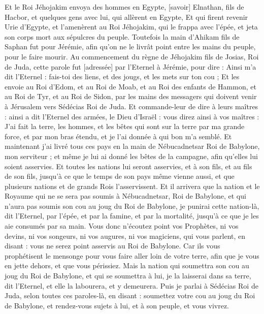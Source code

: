 \begin{multicols}{2}
Et le Roi Jéhojakim envoya des hommes en Egypte, [savoir] Elnathan, fils de Hacbor, et quelques gens avec lui, qui allèrent en Egypte,
Et qui firent revenir Urie d'Egypte, et l'amenèrent au Roi Jéhojakim, qui le frappa avec l'épée, et jeta son corps mort aux sépulcres du peuple.
Toutefois la main d'Ahikam fils de Saphan fut pour Jérémie, afin qu'on ne le livrât point entre les mains du peuple, pour le faire mourir.
\VerseOne{}Au commencement du règne de Jéhojakim fils de Josias, Roi de Juda, cette parole fut [adressée] par l'Eternel à Jérémie, pour dire :
Ainsi m'a dit l'Eternel : fais-toi des liens, et des jougs, et les mets sur ton cou ;
Et les envoie au Roi d'Edom, et au Roi de Moab, et au Roi des enfants de Hammon, et au Roi de Tyr, et au Roi de Sidon, par les mains des messagers qui doivent venir à Jérusalem vers Sédécias Roi de Juda.
Et commande-leur de dire à leurs maîtres : ainsi a dit l'Eternel des armées, le Dieu d'Israël : vous direz ainsi à vos maîtres :
J'ai fait la terre, les hommes, et les bêtes qui sont sur la terre par ma grande force, et par mon bras étendu, et je l'ai donnée à qui bon m'a semblé.
Et maintenant j'ai livré tous ces pays en la main de Nébucadnetsar Roi de Babylone, mon serviteur ; et même je lui ai donné les bêtes de la campagne, afin qu'elles lui soient asservies.
Et toutes les nations lui seront asservies, et à son fils, et au fils de son fils, jusqu’à ce que le temps de son pays même vienne aussi, et que plusieurs nations et de grands Rois l'asservissent.
Et il arrivera que la nation et le Royaume qui ne se sera pas soumis à Nébucadnetsar, Roi de Babylone, et qui n'aura pas soumis son cou au joug du Roi de Babylone, je punirai cette nation-là, dit l'Eternel, par l'épée, et par la famine, et par la mortalité, jusqu’à ce que je les aie consumés par sa main.
Vous donc n'écoutez point vos Prophètes, ni vos devins, ni vos songeurs, ni vos augures, ni vos magiciens, qui vous parlent, en disant : vous ne serez point asservis au Roi de Babylone.
Car ils vous prophétisent le mensonge pour vous faire aller loin de votre terre, afin que je vous en jette dehors, et que vous périssiez.
Mais la nation qui soumettra son cou au joug du Roi de Babylone, et qui se soumettra à lui, je la laisserai dans sa terre, dit l'Eternel, et elle la labourera, et y demeurera.
Puis je parlai à Sédécias Roi de Juda, selon toutes ces paroles-là, en disant : soumettez votre cou au joug du Roi de Babylone, et rendez-vous sujets à lui, et à son peuple, et vous vivrez.

\end{multicols}
